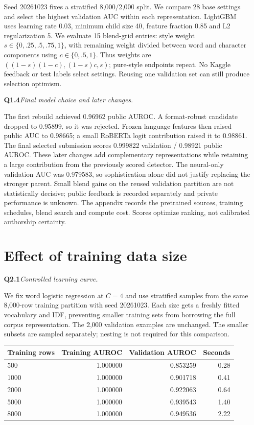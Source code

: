 \documentclass[10pt,letterpaper]{article}
\newcommand{\q}[2]{\needspace{4\baselineskip}\par\addvspace{7pt}\textbf{#1}\quad\textit{#2}\par\nobreak}
\begin{document}
Seed 20261023 fixes a stratified 8,000/2,000 split. We compare 28 base settings and select the highest validation AUC within each representation.
LightGBM uses learning rate 0.03, minimum child size 40, feature fraction 0.85 and L2 regularization 5.
We evaluate 15 blend-grid entries: style weight $s\in\{0,.25,.5,.75,1\}$, with remaining weight divided between word and character components using $c\in\{0,.5,1\}$. Thus weights are $((1-s)(1-c),(1-s)c,s)$; pure-style endpoints repeat.
No Kaggle feedback or test labels select settings. Reusing one validation set can still produce selection optimism.
\q{Q1.4}{Final model choice and later changes.}
The first rebuild achieved 0.96962 public AUROC. A format-robust candidate dropped to 0.95899, so it was rejected.
Frozen language features then raised public AUC to 0.98665; a small RoBERTa logit contribution raised it to 0.98861.
The final selected submission scores 0.999822 validation / 0.98921 public AUROC.
These later changes add complementary representations while retaining a large contribution from the previously scored detector.
The neural-only validation AUC was 0.979583, so sophistication alone did not justify replacing the stronger parent.
Small blend gains on the reused validation partition are not statistically decisive; public feedback is recorded separately and private performance is unknown.
The appendix records the pretrained sources, training schedules, blend search and compute cost. Scores optimize ranking, not calibrated authorship certainty.
\newpage
\section{Effect of training data size}
\q{Q2.1}{Controlled learning curve.}
We fix word logistic regression at $C=4$ and use stratified samples from the same 8,000-row training partition with seed 20261023. Each size gets a freshly fitted vocabulary and IDF, preventing smaller training sets from borrowing the full corpus representation. The 2,000 validation examples are unchanged. The smaller subsets are sampled separately; nesting is not required for this comparison.

\begin{tabularx}{\linewidth}{@{}lrrr@{}}
\toprule
Training rows & Training AUROC & Validation AUROC & Seconds \\ \midrule
500 & 1.000000 & 0.853259 & 0.28 \\
1000 & 1.000000 & 0.901718 & 0.41 \\
2000 & 1.000000 & 0.922063 & 0.64 \\
5000 & 1.000000 & 0.939543 & 1.40 \\
8000 & 1.000000 & 0.949536 & 2.22 \\
\bottomrule
\end{tabularx}
\end{document}
